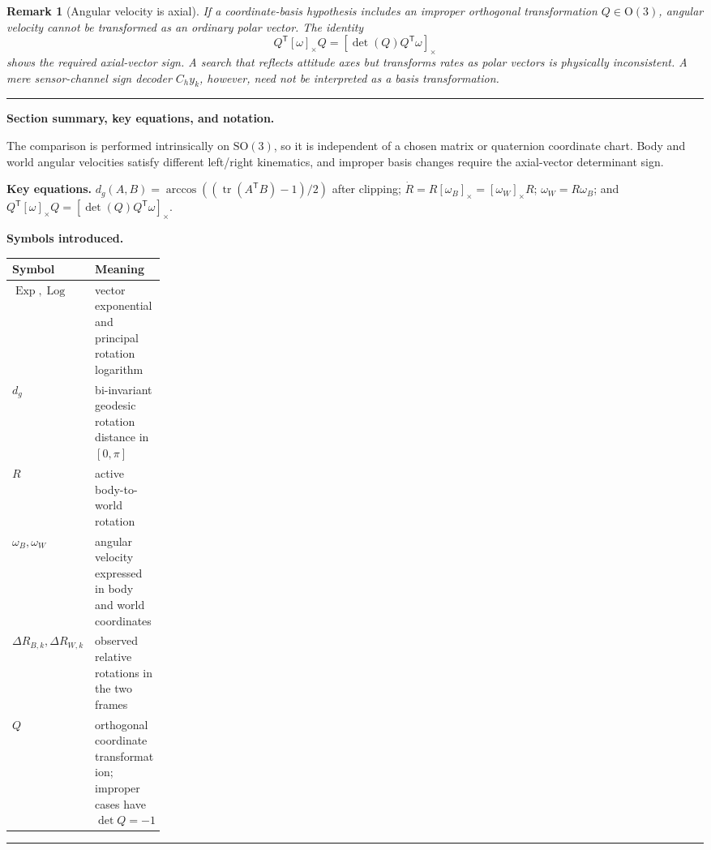 \documentclass[11pt]{article}
\newtheorem{remark}[theorem]{Remark}
\newcommand{\SO}{\mathrm{SO}(3)}
\newcommand{\OO}{\mathrm{O}}
\newcommand{\T}{\mathsf{T}}
\newcommand{\Exp}{\operatorname{Exp}}
\newcommand{\Log}{\operatorname{Log}}
\newenvironment{sectionrecap}
{\par\medskip\begingroup\small\noindent\rule{\linewidth}{0.4pt}\par
\smallskip\noindent\textbf{Section summary, key equations, and notation.}\par\smallskip}
{\par\smallskip\noindent\rule{\linewidth}{0.4pt}\par\endgroup\medskip}
\begin{document}
    \begin{remark}[Angular velocity is axial]
If a coordinate-basis hypothesis includes an improper orthogonal transformation
$Q\in\OO(3)$, angular velocity cannot be transformed as an ordinary polar vector.
The identity
\begin{equation}
    Q^{\T}[\omega]_\times Q
    =[\det(Q)Q^{\T}\omega]_\times
\end{equation}
shows the required axial-vector sign. A search that reflects attitude axes but transforms
rates as polar vectors is physically inconsistent. A mere sensor-channel sign decoder
$C_h y_k$, however, need not be interpreted as a basis transformation.
    \end{remark}

    \begin{sectionrecap}
        The comparison is performed intrinsically on $\SO$, so it is independent of a chosen
        matrix or quaternion coordinate chart. Body and world angular velocities satisfy
        different left/right kinematics, and improper basis changes require the axial-vector
        determinant sign.

        \noindent\textbf{Key equations.}
        \(d_g(A,B)=\arccos((\operatorname{tr}(A^{\mathsf T}B)-1)/2)\) after clipping;
        \(\dot R=R[\omega_B]_\times=[\omega_W]_\times R\);
        \(\omega_W=R\omega_B\); and
        \(Q^{\mathsf T}[\omega]_\times Q=[\det(Q)Q^{\mathsf T}\omega]_\times\).

        \noindent\textbf{Symbols introduced.}
        \par\noindent\begin{tabularx}{\linewidth}{@{}p{0.22\linewidth}Y@{}}
\toprule
Symbol & Meaning \\
\midrule
$\Exp,\Log$ & vector exponential and principal rotation logarithm \\
$d_g$ & bi-invariant geodesic rotation distance in $[0,\pi]$ \\
$R$ & active body-to-world rotation \\
$\omega_B,\omega_W$ & angular velocity expressed in body and world coordinates \\
$\Delta R_{B,k},\Delta R_{W,k}$ & observed relative rotations in the two frames \\
$Q$ & orthogonal coordinate transformation; improper cases have $\det Q=-1$ \\
\bottomrule
        \end{tabularx}
    \end{sectionrecap}
\end{document}
